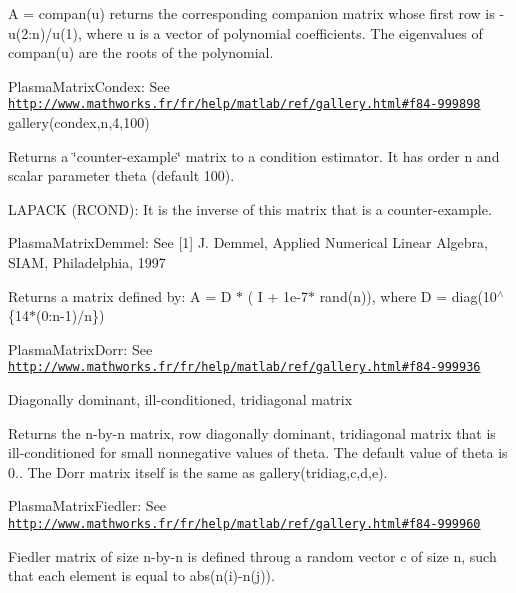 A = compan(u) returns the corresponding companion matrix whose first row is -\/u(2\+:n)/u(1), where u is a vector of polynomial coefficients. The eigenvalues of compan(u) are the roots of the polynomial.

\begin{DoxyItemize}
\item Plasma\+Matrix\+Condex\+: See \href{http://www.mathworks.fr/fr/help/matlab/ref/gallery.html#f84-999898}{\tt http\+://www.\+mathworks.\+fr/fr/help/matlab/ref/gallery.\+html\#f84-\/999898} gallery(\textquotesingle{}condex\textquotesingle{},n,4,100)\end{DoxyItemize}
Returns a \char`\"{}counter-\/example\char`\"{} matrix to a condition estimator. It has order n and scalar parameter theta (default 100).

L\+A\+P\+A\+C\+K (R\+C\+O\+N\+D)\+: It is the inverse of this matrix that is a counter-\/example.

\begin{DoxyItemize}
\item Plasma\+Matrix\+Demmel\+: See \mbox{[}1\mbox{]} J. Demmel, Applied Numerical Linear Algebra, S\+I\+A\+M, Philadelphia, 1997\end{DoxyItemize}
Returns a matrix defined by\+: A = D $\ast$ ( I + 1e-\/7$\ast$ rand(n)), where D = diag(10$^\wedge$\{14$\ast$(0\+:n-\/1)/n\})

\begin{DoxyItemize}
\item Plasma\+Matrix\+Dorr\+: See \href{http://www.mathworks.fr/fr/help/matlab/ref/gallery.html#f84-999936}{\tt http\+://www.\+mathworks.\+fr/fr/help/matlab/ref/gallery.\+html\#f84-\/999936}\end{DoxyItemize}
Diagonally dominant, ill-\/conditioned, tridiagonal matrix

Returns the n-\/by-\/n matrix, row diagonally dominant, tridiagonal matrix that is ill-\/conditioned for small nonnegative values of theta. The default value of theta is 0.. The Dorr matrix itself is the same as gallery(\textquotesingle{}tridiag\textquotesingle{},c,d,e).

\begin{DoxyItemize}
\item Plasma\+Matrix\+Fiedler\+: See \href{http://www.mathworks.fr/fr/help/matlab/ref/gallery.html#f84-999960}{\tt http\+://www.\+mathworks.\+fr/fr/help/matlab/ref/gallery.\+html\#f84-\/999960}\end{DoxyItemize}
Fiedler matrix of size n-\/by-\/n is defined throug a random vector c of size n, such that each element is equal to abs(n(i)-\/n(j)).


